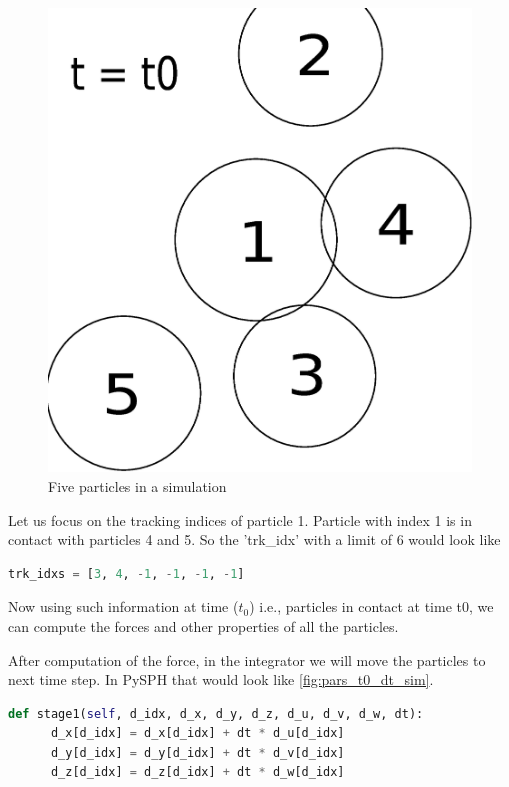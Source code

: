 \begin{figure}[H]
\centering
\includegraphics[scale=0.2]{figures/pars_t0.eps}
\caption{Five particles in a simulation\label{fig:pars_t0_sim}}
\end{figure}

Let us focus on the tracking indices of particle 1. Particle with index 1 is
in contact with particles 4 and 5. So the 'trk\_idx' with a limit of 6 would
look like

\begin{lstlisting}[language=Python]
     trk_idxs = [3, 4, -1, -1, -1, -1]
\end{lstlisting}

Now using such information at time ($t_0$) i.e., particles in contact at time t0, we
can compute the forces and other properties of all the particles.

After computation of the force, in the integrator we will move the particles
to next time step. In PySPH that would look like \ref{fig:pars_t0_dt_sim}.
\begin{lstlisting}[language=Python]
      def stage1(self, d_idx, d_x, d_y, d_z, d_u, d_v, d_w, dt):
      d_x[d_idx] = d_x[d_idx] + dt * d_u[d_idx]
      d_y[d_idx] = d_y[d_idx] + dt * d_v[d_idx]
      d_z[d_idx] = d_z[d_idx] + dt * d_w[d_idx]
\end{lstlisting}

